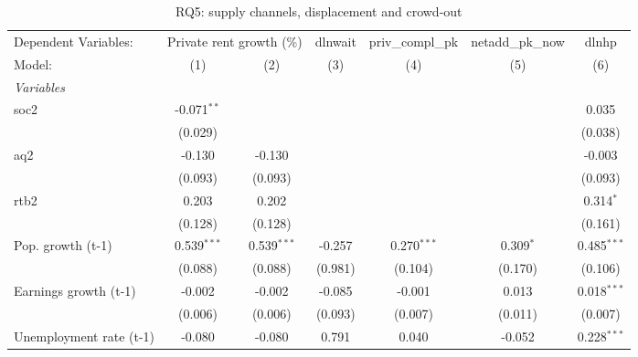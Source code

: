 
\begin{table}[htbp]
   \caption{RQ5: supply channels, displacement and crowd-out}
   \centering
   \begin{tabular}{lcccccc}
      \tabularnewline \midrule \midrule
      Dependent Variables: & \multicolumn{2}{c}{Private rent growth (\%)} & dlnwait & priv\_compl\_pk & netadd\_pk\_now & dlnhp\\
      Model:                                     & (1)           & (2)           & (3)          & (4)            & (5)           & (6)\\  
      \midrule
      \emph{Variables}\\
      soc2                                       & -0.071$^{**}$ &               &              &                &               & 0.035\\   
                                                 & (0.029)       &               &              &                &               & (0.038)\\   
      aq2                                        & -0.130        & -0.130        &              &                &               & -0.003\\   
                                                 & (0.093)       & (0.093)       &              &                &               & (0.093)\\   
      rtb2                                       & 0.203         & 0.202         &              &                &               & 0.314$^{*}$\\   
                                                 & (0.128)       & (0.128)       &              &                &               & (0.161)\\   
      Pop. growth (t-1)                          & 0.539$^{***}$ & 0.539$^{***}$ & -0.257       & 0.270$^{***}$  & 0.309$^{*}$   & 0.485$^{***}$\\   
                                                 & (0.088)       & (0.088)       & (0.981)      & (0.104)        & (0.170)       & (0.106)\\   
      Earnings growth (t-1)                      & -0.002        & -0.002        & -0.085       & -0.001         & 0.013         & 0.018$^{***}$\\   
                                                 & (0.006)       & (0.006)       & (0.093)      & (0.007)        & (0.011)       & (0.007)\\   
      Unemployment rate (t-1)                    & -0.080        & -0.080        & 0.791        & 0.040          & -0.052        & 0.228$^{***}$\\   

\end{tabular}
\end{table}
